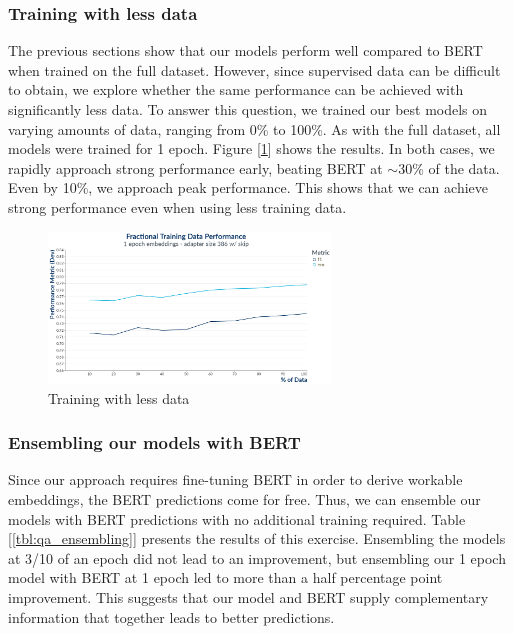 \subsubsection{Training with less data}
The previous sections show that our models perform well compared to BERT when trained on the full dataset. However, since supervised data can be difficult to obtain, we explore whether the same performance can be achieved with significantly less data. To answer this question, we trained our best models on varying amounts of data, ranging from 0\% to 100\%. As with the full dataset, all models were trained for 1 epoch. Figure [\ref{fig:1_epoch_embeddings__adapter_386_with_skip}] shows the results. In both cases, we rapidly approach strong performance early, beating BERT at $\sim$30\% of the data. Even by 10\%, we approach peak performance. This shows that we can achieve strong performance even when using less training data. 

\begin{figure}[ht]
	\centering
	\includegraphics[width=7.5cm]{images/1_Epoch_Embeddings__Adapter_386_with_Skip.png}
	\caption{\label{fig:1_epoch_embeddings__adapter_386_with_skip}Training with less data}
\end{figure}

\subsubsection{Ensembling our models with BERT}

Since our approach requires fine-tuning BERT in order to derive workable embeddings, the BERT predictions come for free. Thus, we can ensemble our models with BERT predictions with no additional training required. Table [\ref{tbl:qa_ensembling}] presents the results of this exercise. Ensembling the models at 3/10 of an epoch did not lead to an improvement, but ensembling our 1 epoch model with BERT at 1 epoch led to more than a half percentage point improvement. This suggests that our model and BERT supply complementary information that together leads to better predictions.

